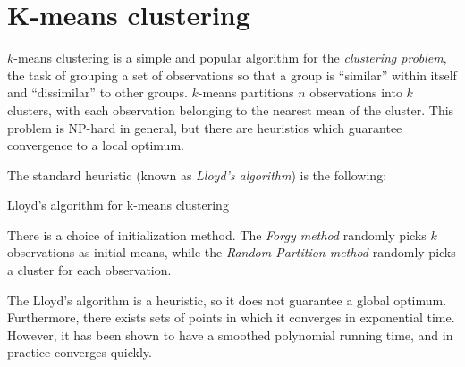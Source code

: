 \documentclass[../tech_report_1.tex]{subfiles}
\begin{document}
\part*{K-means clustering}

$k$-means clustering is a simple and popular algorithm for the \textit{clustering
problem}, the task of grouping a set of observations so that a group
is ``similar'' within itself and ``dissimilar'' to other groups.
$k$-means partitions $n$ observations into $k$ clusters, with each
observation belonging to the nearest mean of the cluster. This problem
is NP-hard in general, but there are heuristics which guarantee convergence
to a local optimum.

The standard heuristic (known as \textit{Lloyd's algorithm}) is the
following:

\begin{algorithm}
\caption{Lloyd's algorithm for k-means clustering}


\begin{algorithmic}[1]
\EndWhile
\end{algorithmic} 
\end{algorithm}


There is a choice of initialization method. The \textit{Forgy method}
randomly picks $k$ observations as initial means, while the \textit{Random
Partition method} randomly picks a cluster for each observation.

The Lloyd's algorithm is a heuristic, so it does not guarantee a global
optimum. Furthermore, there exists sets of points in which it converges
in exponential time. However, it has been shown to have a smoothed
polynomial running time, and in practice converges quickly.
\end{document}
